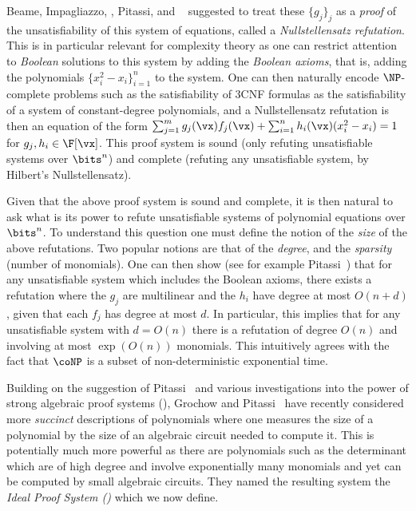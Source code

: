 \documentclass[11pt]{article}
\numberwithin{equation}{section}
\theoremstyle{definition}
\theoremstyle{plain}
\begin{document}
Beame, Impagliazzo, \Krajicek, Pitassi, and \Pudlak~\cite{BeameIKPP96} suggested to treat these $\{g_j\}_j$ as a \emph{proof} of the unsatisfiability of this system of equations, called a \emph{Nullstellensatz refutation}.  This is in particular relevant for complexity theory as one can restrict attention to \emph{Boolean} solutions to this system by adding the \emph{Boolean axioms}, that is, adding the polynomials $\{x_i^2-x_i\}_{i=1}^n$ to the system.
One can then naturally encode $\NP$-complete problems such as the satisfiability of 3CNF formulas as the satisfiability of a system of constant-degree polynomials, and a Nullstellensatz refutation is then an equation of the form $\sum_{j=1}^m g_j(\vx)f_j(\vx)+\sum_{i=1}^n h_i(\vx)(x_i^2-x_i)=1$ for $g_j,h_i\in\F[\vx]$.  This proof system is sound (only refuting unsatisfiable systems over $\bits^n$) and complete (refuting any unsatisfiable system, by Hilbert's Nullstellensatz).

Given that the above proof system is sound and complete, it is then natural to ask what is its power to refute unsatisfiable systems of polynomial equations over $\bits^n$.  To understand this question one must define the notion of the \emph{size} of the above refutations.  Two popular notions are that of the \emph{degree}, and the \emph{sparsity} (number of monomials). One can then show (see for example Pitassi~\cite{Pitassi97}) that for any unsatisfiable system which includes the Boolean axioms, there exists a refutation
where the $g_j$ are multilinear and  the $h_i$ have degree at most $O(n+d)$, given that each $f_j$ has degree at most $d$.  In particular, this implies that for any unsatisfiable system with $d=O(n)$ there is a refutation of degree $O(n)$ and involving at most $\exp(O(n))$ monomials.  This intuitively agrees with the fact that $\coNP$ is a subset of non-deterministic exponential time.

Building on the suggestion of Pitassi~\cite{Pitassi97} and various investigations into the power of strong algebraic proof systems (\cite{GrigorievHirsch03,RazTzameret08a,RazTzameret08b}), Grochow and Pitassi~\cite{DBLP:journals/jacm/GrochowP18} have recently considered more \emph{succinct} descriptions of polynomials where one measures the size of a polynomial by the size of an algebraic circuit needed to compute it.  This is potentially much more powerful as there are polynomials such as the determinant which are of high degree and involve exponentially many monomials and yet can be computed by small algebraic circuits. They named the resulting system the \emph{Ideal Proof System (\IPS)} which we now define.
\end{document}

